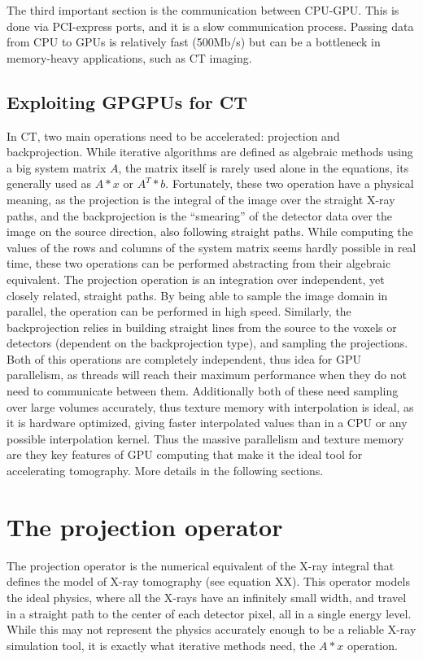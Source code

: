 The third important section is the communication between CPU-GPU. This is done via PCI-express ports, and it is a slow communication process. Passing data from CPU to GPUs is relatively fast (500Mb/s) but can be a bottleneck in memory-heavy applications, such as CT imaging.



\subsection{Exploiting GPGPUs for CT}

In CT, two main operations need to be accelerated: projection and backprojection. While iterative algorithms are defined as algebraic methods using a big system matrix $A$, the matrix itself is rarely used alone in the equations, its generally used as $A*x$ or $A^T*b$. Fortunately, these two operation have a physical meaning, as the projection is the integral of the image over the straight X-ray paths, and the backprojection is the ``smearing'' of the detector data over the image on the source direction, also following straight paths. While computing the values of the rows and columns of the system matrix seems hardly possible in real time, these two operations can be performed abstracting from their algebraic equivalent. The projection operation is an integration over independent, yet closely related, straight paths. By being able to sample the image domain in parallel, the operation can be performed in high speed. Similarly, the backprojection relies in building straight lines from the source to the voxels or detectors (dependent on the backprojection type), and sampling the projections. Both of this operations are completely independent, thus idea for GPU parallelism, as threads will reach their maximum performance when they do not need to communicate between them.  Additionally both of these need sampling over large volumes accurately, thus texture memory with interpolation is ideal, as it is hardware optimized, giving faster interpolated values than in a CPU or any possible interpolation kernel. Thus the massive parallelism and texture memory are they key features of GPU computing that make it the ideal tool for accelerating tomography. More details in the following sections.

\section{The projection operator}
The projection operator is the numerical equivalent of the X-ray integral that defines the model of X-ray tomography (see equation XX). This operator models the ideal physics, where all the X-rays have an infinitely small width, and travel in a straight path to the center of each detector pixel, all in a single energy level. While this may not represent the physics accurately enough to be a reliable X-ray  simulation tool, it is exactly what iterative methods need, the $A*x$ operation. 


